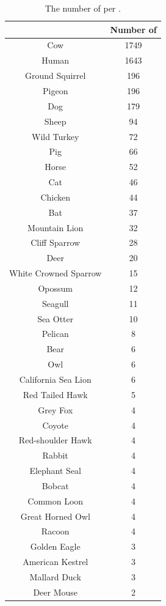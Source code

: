 \begin{longtable}{|c|c|}
\caption{The number of \isols{} per \spec{}.}
\endfirsthead
\hline
\bf \Spec{} & \bf Number of \Isols{} \\ \hline
\endhead
Cow & 1749 \\ \hline
Human & 1643 \\ \hline
Ground Squirrel & 196 \\ \hline
Pigeon & 196 \\ \hline
Dog & 179 \\ \hline
Sheep & 94 \\ \hline
Wild Turkey & 72 \\ \hline
Pig & 66 \\ \hline
Horse & 52 \\ \hline
Cat & 46 \\ \hline
Chicken & 44 \\ \hline
Bat & 37 \\ \hline
Mountain Lion & 32 \\ \hline
Cliff Sparrow & 28 \\ \hline
Deer & 20 \\ \hline
White Crowned Sparrow & 15 \\ \hline
Opossum & 12 \\ \hline
Seagull & 11 \\ \hline
Sea Otter & 10 \\ \hline
Pelican & 8 \\ \hline
Bear & 6 \\ \hline
Owl & 6 \\ \hline
California Sea Lion & 6 \\ \hline
Red Tailed Hawk & 5 \\ \hline
Grey Fox & 4 \\ \hline
Coyote & 4 \\ \hline
Red-shoulder Hawk & 4 \\ \hline
Rabbit & 4 \\ \hline
Elephant Seal & 4 \\ \hline
Bobcat & 4 \\ \hline
Common Loon & 4 \\ \hline
Great Horned Owl & 4 \\ \hline
Racoon & 4 \\ \hline
Golden Eagle & 3 \\ \hline
American Kestrel & 3 \\ \hline
Mallard Duck & 3 \\ \hline
Deer Mouse & 2 \\ \hline

\end{longtable}
